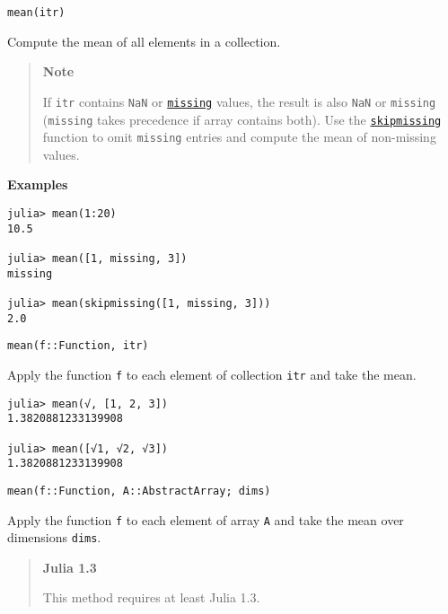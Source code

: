 \begin{adjustwidth}{2em}{0pt}


\begin{verbatim}
mean(itr)
\end{verbatim}

Compute the mean of all elements in a collection.

\begin{quote}
\textbf{Note}

If \texttt{itr} contains \texttt{NaN} or \hyperlink{14596725676261444434}{\texttt{missing}} values, the result is also \texttt{NaN} or \texttt{missing} (\texttt{missing} takes precedence if array contains both). Use the \hyperlink{2012470681884771400}{\texttt{skipmissing}} function to omit \texttt{missing} entries and compute the mean of non-missing values.

\end{quote}
\textbf{Examples}


\begin{verbatim}
julia> mean(1:20)
10.5

julia> mean([1, missing, 3])
missing

julia> mean(skipmissing([1, missing, 3]))
2.0
\end{verbatim}




\begin{lstlisting}
mean(f::Function, itr)
\end{lstlisting}

Apply the function \texttt{f} to each element of collection \texttt{itr} and take the mean.


\begin{verbatim}
julia> mean(√, [1, 2, 3])
1.3820881233139908

julia> mean([√1, √2, √3])
1.3820881233139908
\end{verbatim}




\begin{lstlisting}
mean(f::Function, A::AbstractArray; dims)
\end{lstlisting}

Apply the function \texttt{f} to each element of array \texttt{A} and take the mean over dimensions \texttt{dims}.

\begin{quote}
\textbf{Julia 1.3}

This method requires at least Julia 1.3.

\end{quote}


\end{adjustwidth}
